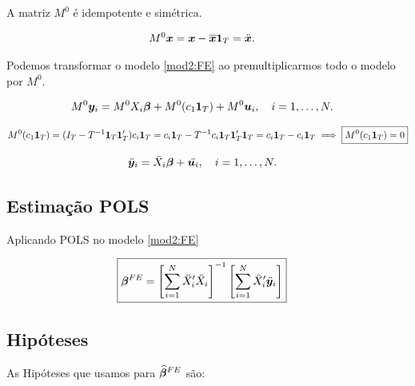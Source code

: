 \documentclass[11pt,oneside,a4paper]{article}
\numberwithin{equation}{section}
\begin{document}
\noindent
A matriz $M^{0}$ é idempotente e simétrica.

\begin{align*}
	M^{0} \boldsymbol{x} &= \boldsymbol{x} - \overline{\boldsymbol{x}} \boldsymbol{1}_{T}
	= \ddot{\boldsymbol{x}}.
\end{align*}

Podemos transformar o modelo \eqref{mod2:FE} ao premultiplicarmos todo o modelo por $M^{0}$.

\vspace{-1 em}
\begin{align*} 
M^{0} \boldsymbol{y}_{i} &= M^{0} X_{i} \boldsymbol{\beta} + M^{0} ( c_{1} \boldsymbol{1}_{T} ) + M^{0} \boldsymbol{u}_{i},
\quad i = 1, \dots, N.
\end{align*}

\vspace{-1 em}
\begin{align*} 
M^{0} ( c_{1} \boldsymbol{1}_{T} ) = 
( I_{T} - T^{-1} \boldsymbol{1}_{T} \boldsymbol{1}_{T}' ) c_{i} \boldsymbol{1}_{T} 
=
c_{i} \boldsymbol{1}_{T} - T^{-1} c_{i} \boldsymbol{1}_{T} \boldsymbol{1}_{T}' \boldsymbol{1}_{T} 
=
c_{i} \boldsymbol{1}_{T} - c_{i} \boldsymbol{1}_{T} 
\implies
\boxed{ M^{0} ( c_{1} \boldsymbol{1}_{T} ) = 0 }
\end{align*}

\vspace{-1 em}
\begin{align} \label{mod2:FE}
\ddot{\boldsymbol{y}}_{i} &= \ddot{X}_{i} \boldsymbol{\beta} + \ddot{\boldsymbol{u}_{i}},
\quad i = 1, \dots, N.
\end{align}

\subsection*{Estimação POLS}

Aplicando POLS no modelo \eqref{mod2:FE}

\vspace{-1 em}
\begin{align} \label{beta:pols:FE}
\Aboxed{
\mbs{\beta}^{FE} =
\left[ \sum_{i=1}^{N} \ddot{X}_{i}' \ddot{X}_{i} \right]^{-1}
\left[ \sum_{i=1}^{N} \ddot{X}_{i}' \ddot{\mbs{y}}_{i} \right]
}
\end{align}

\subsection*{Hipóteses}

As Hipóteses que usamos para $\boldsymbol{\widehat{\beta}}^{FE}$ são:
\end{document}
